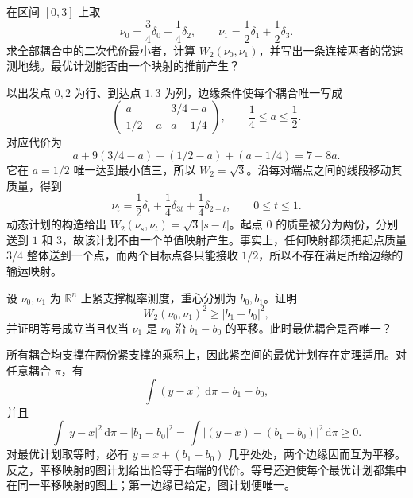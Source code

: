\BookExercises

\begin{exercise}\label{g3:ex:C-finite-plan}
	在区间 \([0,3]\) 上取
	\[
		\nu_0=\frac34\delta_0+\frac14\delta_2,
		\qquad\nu_1=\frac12\delta_1+\frac12\delta_3.
	\]
	求全部耦合中的二次代价最小者，计算 \(W_2(\nu_0,\nu_1)\)，并写出一条连接两者的常速测地线。最优计划能否由一个映射的推前产生？
\end{exercise}
\begin{solution}
	以出发点 \(0,2\) 为行、到达点 \(1,3\) 为列，边缘条件使每个耦合唯一写成
	\[
		\begin{pmatrix}
		 a&3/4-a\\ 1/2-a&a-1/4
		\end{pmatrix},\qquad \frac14\le a\le\frac12.
	\]
	对应代价为
	\[
		a+9(3/4-a)+(1/2-a)+(a-1/4)=7-8a.
	\]
	它在 \(a=1/2\) 唯一达到最小值三，所以 \(W_2=\sqrt3\)。沿每对端点之间的线段移动其质量，得到
	\[
		\nu_t=\frac12\delta_t+\frac14\delta_{3t}+\frac14\delta_{2+t},
		\qquad0\le t\le1.
	\]
	动态计划的构造给出 \(W_2(\nu_s,\nu_t)=\sqrt3|s-t|\)。起点 \(0\) 的质量被分为两份，分别送到 \(1\) 和 \(3\)，故该计划不由一个单值映射产生。事实上，任何映射都须把起点质量 \(3/4\) 整体送到一个点，而两个目标点各只能接收 \(1/2\)，所以不存在满足所给边缘的 输运映射。
\end{solution}

\begin{exercise}\label{g3:ex:C-barycenter-bound}
	设 \(\nu_0,\nu_1\) 为 \(\mathbb R^n\) 上紧支撑概率测度，重心分别为 \(b_0,b_1\)。证明
	\[
		W_2(\nu_0,\nu_1)^2\ge|b_1-b_0|^2,
	\]
	并证明等号成立当且仅当 \(\nu_1\) 是 \(\nu_0\) 沿 \(b_1-b_0\) 的平移。此时最优耦合是否唯一？
\end{exercise}
\begin{solution}
	所有耦合均支撑在两份紧支撑的乘积上，因此紧空间的最优计划存在定理适用。对任意耦合 \(\pi\)，有
	\[
		\int(y-x)\,\mathrm d\pi=b_1-b_0,
	\]
	并且
	\[
		\int|y-x|^2\,\mathrm d\pi-|b_1-b_0|^2
		=\int|(y-x)-(b_1-b_0)|^2\,\mathrm d\pi\ge0.
	\]
	对最优计划取等时，必有 \(y=x+(b_1-b_0)\) 几乎处处，两个边缘因而互为平移。反之，平移映射的图计划给出恰等于右端的代价。等号还迫使每个最优计划都集中在同一平移映射的图上；第一边缘已给定，图计划便唯一。
\end{solution}

